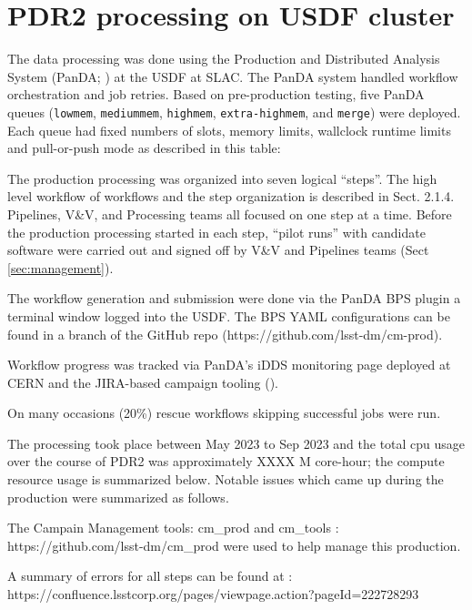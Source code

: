 \section{PDR2 processing on USDF cluster} \label{sec:processing}

The data processing was done using the Production and Distributed Analysis System (PanDA; ) at the USDF at SLAC.
The PanDA system handled workflow orchestration and job retries.
Based on pre-production testing, five PanDA queues (\texttt{lowmem}, \texttt{mediummem}, \texttt{highmem}, \texttt{extra-highmem}, and  \texttt{merge}) were deployed. Each queue had fixed numbers of slots, memory limits, wallclock runtime limits and pull-or-push mode as described in this table:

The production processing was organized into seven logical ``steps''.
The high level workflow of workflows and the step organization is described in  Sect. 2.1.4.
Pipelines, V\&V, and Processing teams all focused on one step at a time.
Before the production processing started in each step, ``pilot runs'' with candidate software were carried out and signed off by V\&V and Pipelines teams
(Sect \ref{sec:management}).

The workflow generation and submission were done via the PanDA BPS plugin a terminal window logged into the USDF.
The BPS YAML configurations can be found in a branch of the  GitHub repo (https://github.com/lsst-dm/cm-prod).

Workflow progress was tracked via PanDA's iDDS monitoring page deployed at CERN and the JIRA-based campaign tooling ().

On many occasions (20\%) rescue workflows skipping successful jobs were run.

The processing took place  between May 2023 to Sep 2023 and the total cpu usage over the course of PDR2 was approximately XXXX M core-hour; the compute resource usage is summarized below.
Notable issues which came up during the production were summarized as follows.

The Campain Management tools: cm_prod and cm_tools : https://github.com/lsst-dm/cm_prod were used to help manage this production.  

A summary of errors for all steps can be found at : https://confluence.lsstcorp.org/pages/viewpage.action?pageId=222728293

